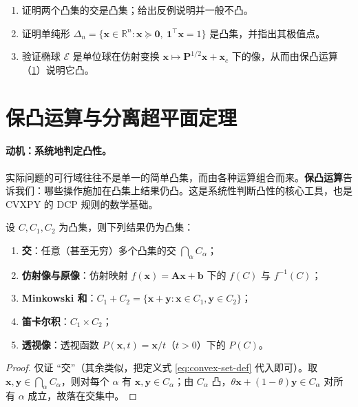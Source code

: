 \begin{practice}
\begin{enumerate}
  \item 证明两个凸集的交是凸集；给出反例说明并一般不凸。
  \item 证明单纯形 $\Delta_n=\{\mathbf x\in\mathbb{R}^n:\mathbf x\succeq\mathbf 0,\ \mathbf 1^\top\mathbf x=1\}$ 是凸集，并指出其极值点。
  \item 验证椭球 $\mathcal E$ 是单位球在仿射变换 $\mathbf x\mapsto\mathbf P^{1/2}\mathbf x+\mathbf x_c$ 下的像，从而由保凸运算（\cref{sec:cvx-separation}）说明它凸。
\end{enumerate}
\end{practice}

\section{保凸运算与分离超平面定理}
\label{sec:cvx-separation}

\paragraph{动机：系统地判定凸性。}
实际问题的可行域往往不是单一的简单凸集，而由各种运算组合而来。\textbf{保凸运算}告诉我们：哪些操作施加在凸集上结果仍凸。这是系统性判断凸性的核心工具，也是 CVXPY 的 DCP 规则的数学基础。

\begin{theorem}[凸集的保凸运算]\label{thm:set-ops}
设 $C,C_1,C_2$ 为凸集，则下列结果仍为凸集：
\begin{enumerate}
  \item \textbf{交}：任意（甚至无穷）多个凸集的交 $\bigcap_\alpha C_\alpha$；
  \item \textbf{仿射像与原像}：仿射映射 $f(\mathbf x)=\mathbf A\mathbf x+\mathbf b$ 下的 $f(C)$ 与 $f^{-1}(C)$；
  \item \textbf{Minkowski 和}：$C_1+C_2=\{\mathbf x+\mathbf y:\mathbf x\in C_1,\mathbf y\in C_2\}$；
  \item \textbf{笛卡尔积}：$C_1\times C_2$；
  \item \textbf{透视像}：透视函数 $P(\mathbf x,t)=\mathbf x/t$（$t>0$）下的 $P(C)$。
\end{enumerate}
\end{theorem}
\begin{proof}
仅证 “交”（其余类似，把定义式 \cref{eq:convex-set-def} 代入即可）。取 $\mathbf x,\mathbf y\in\bigcap_\alpha C_\alpha$，则对每个 $\alpha$ 有 $\mathbf x,\mathbf y\in C_\alpha$；由 $C_\alpha$ 凸，$\theta\mathbf x+(1-\theta)\mathbf y\in C_\alpha$ 对所有 $\alpha$ 成立，故落在交集中。
\end{proof}

